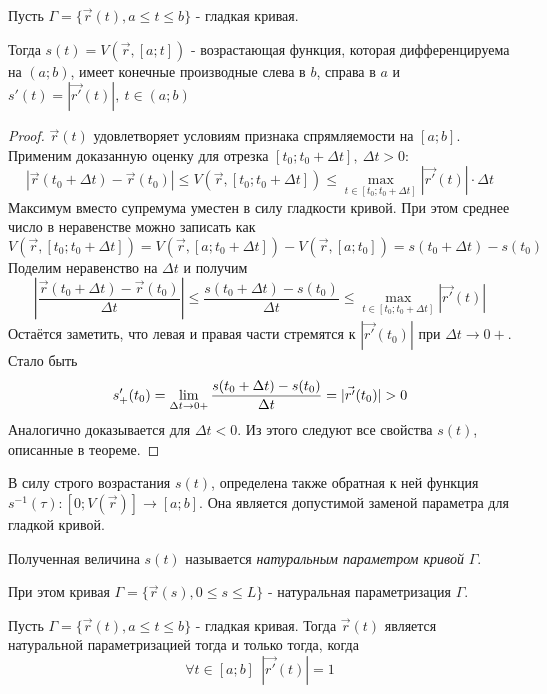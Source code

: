 \begin{theorem}
	Пусть $\Gamma = \{\vec{r}(t), a \le t \le b\}$ - гладкая кривая.
	
	Тогда \(s(t) = V(\vec{r}, [a; t])\) - возрастающая функция, которая дифференцируема на $(a; b)$, имеет конечные производные слева в $b$, справа в $a$ и \(s'(t) = |\vec{r'}(t)|,\ t \in (a; b)\)
\end{theorem}

\begin{proof}
	$\vec{r}(t)$ удовлетворяет условиям признака спрямляемости на $[a; b]$. Применим доказанную оценку для отрезка $[t_0; t_0 + \Delta t],\ \Delta t > 0$:
	\[
		|\vec{r}(t_0 + \Delta t) - \vec{r}(t_0)| \le V(\vec{r}, [t_0; t_0 + \Delta t]) \le \max\limits_{t \in [t_0; t_0 + \Delta t]} |\vec{r'}(t)| \cdot \Delta t
	\]
	Максимум вместо супремума уместен в силу гладкости кривой. При этом среднее число в неравенстве можно записать как
	\[
		V(\vec{r}, [t_0; t_0 + \Delta t]) = V(\vec{r}, [a; t_0 + \Delta t]) - V(\vec{r}, [a; t_0]) = s(t_0 + \Delta t) - s(t_0)
	\]
	Поделим неравенство на $\Delta t$ и получим
	\[
		\left|\frac{\vec{r}(t_0 + \Delta t) - \vec{r}(t_0)}{\Delta t}\right| \le \frac{s(t_0 + \Delta t) - s(t_0)}{\Delta t} \le \max\limits_{t \in [t_0; t_0 + \Delta t]} |\vec{r'}(t)|
	\]
	Остаётся заметить, что левая и правая части стремятся к $|\vec{r'}(t_0)|$ при $\Delta t \to 0+$. Стало быть
	\[
		s'_+(t_0) = \lim\limits_{\Delta t \to 0+} \frac{s(t_0 + \Delta t) - s(t_0)}{\Delta t} = |\vec{r'}(t_0)| > 0
	\]
	Аналогично доказывается для $\Delta t < 0$. Из этого следуют все свойства $s(t)$, описанные в теореме.
\end{proof}

\begin{corollary}
	В силу строго возрастания $s(t)$, определена также обратная к ней функция $s^{-1}(\tau): [0; V(\vec{r})] \to [a; b]$. Она является допустимой заменой параметра для гладкой кривой.
\end{corollary}

\begin{definition}
	Полученная величина $s(t)$ называется \textit{натуральным параметром кривой} $\Gamma$.
	
	При этом кривая $\Gamma = \{\vec{r}(s), 0 \le s \le L\}$ - натуральная параметризация $\Gamma$.
\end{definition}

\begin{lemma}
	Пусть $\Gamma = \{\vec{r}(t), a \le t \le b\}$ - гладкая кривая. Тогда $\vec{r}(t)$ является натуральной параметризацией тогда и только тогда, когда
	\[
		\forall t \in [a; b]\ \ |\vec{r'}(t)| = 1
	\]
\end{lemma}

